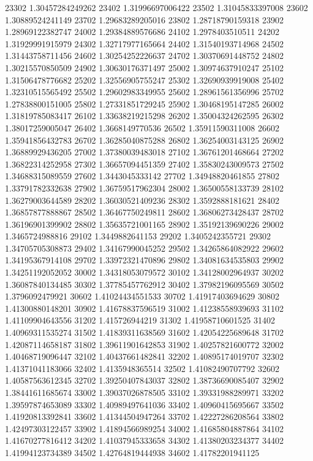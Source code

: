 {23302 1.30457284249262
23402 1.31996697006422
23502 1.31045833397008
23602 1.30889524241149
23702 1.29683289205016
23802 1.28718790159318
23902 1.28969122382747
24002 1.29384889576686
24102 1.2978403510511
24202 1.31929991915979
24302 1.32717977165664
24402 1.31540193714968
24502 1.31443758711456
24602 1.30254252226637
24702 1.30370691448752
24802 1.30215570850509
24902 1.30630176371497
25002 1.30974637910247
25102 1.31506478776682
25202 1.32556905755247
25302 1.32690939919008
25402 1.32310515565492
25502 1.29602983349955
25602 1.28961561356996
25702 1.27838800151005
25802 1.27331851729245
25902 1.30468195147285
26002 1.31819785083417
26102 1.33638219215298
26202 1.35004324262595
26302 1.38017259005047
26402 1.3668149770536
26502 1.35911590311008
26602 1.35941856432783
26702 1.36285040875288
26802 1.36254003143125
26902 1.36889929436205
27002 1.37380039483018
27102 1.36761201468664
27202 1.36822314252958
27302 1.36657094451359
27402 1.35830243009573
27502 1.34688315089559
27602 1.3443045333142
27702 1.34948820461855
27802 1.33791782332638
27902 1.36759517962304
28002 1.36500558133739
28102 1.36279003644589
28202 1.36030521409236
28302 1.3592888181621
28402 1.36857877888867
28502 1.36467750249811
28602 1.36806273428437
28702 1.36196901399902
28802 1.35635721001165
28902 1.35192139690226
29002 1.3465724988816
29102 1.3449882641153
29202 1.3405242355721
29302 1.34705705308873
29402 1.34167990045252
29502 1.34265864082922
29602 1.34195367914108
29702 1.33972321470896
29802 1.34081634535803
29902 1.34251192052052
30002 1.34318053079572
30102 1.34128002964937
30202 1.36087840134485
30302 1.37785457762912
30402 1.37982196095569
30502 1.3796092479921
30602 1.41024434551533
30702 1.41917403694629
30802 1.41300880148201
30902 1.41678837596519
31002 1.41238558939693
31102 1.41109904643556
31202 1.415726944219
31302 1.41958710601525
31402 1.40969311535274
31502 1.41839311638569
31602 1.42054225689648
31702 1.42087114658187
31802 1.39611901642853
31902 1.40257821600772
32002 1.40468719096447
32102 1.40437661482841
32202 1.40895174019707
32302 1.41371041183066
32402 1.4135948365514
32502 1.41082490707792
32602 1.40587563612345
32702 1.39250407843037
32802 1.38736690085407
32902 1.38441611685674
33002 1.39037026878505
33102 1.39331988289971
33202 1.39597874653089
33302 1.40989497641036
33402 1.40960415695667
33502 1.41920813392841
33602 1.41344504947264
33702 1.42227286208564
33802 1.42497303122457
33902 1.41894566989254
34002 1.41685804887864
34102 1.41670277816412
34202 1.41037945333658
34302 1.41380203234377
34402 1.41994123734389
34502 1.42764819444938
34602 1.41782201941125
}
